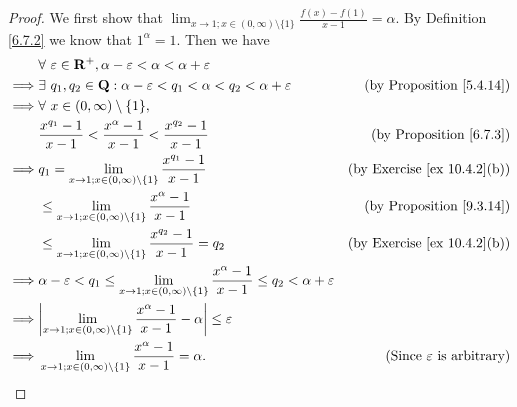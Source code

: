\begin{proof}
    We first show that \(\lim_{x \to 1 ; x \in (0, \infty) \setminus \{1\}} \frac{f(x) - f(1)}{x - 1} = \alpha\).
    By Definition \ref{6.7.2} we know that \(1^{\alpha} = 1\).
    Then we have
    \begin{align*}
                 & \forall\ \varepsilon \in \mathbf{R}^+, \alpha - \varepsilon < \alpha < \alpha + \varepsilon                                                                                                   \\
        \implies & \exists\ q_1, q_2 \in \mathbf{Q} : \alpha - \varepsilon < q_1 < \alpha < q_2 < \alpha + \varepsilon                                             & \text{(by Proposition \ref{5.4.14})}        \\
        \implies & \forall\ x \in (0, \infty) \setminus \{1\},                                                                                                                                                   \\
                 & \frac{x^{q_1} - 1}{x - 1} < \frac{x^{\alpha} - 1}{x - 1} < \frac{x^{q_2} - 1}{x - 1}                                                            & \text{(by Proposition \ref{6.7.3})}         \\
        \implies & q_1 = \lim_{x \to 1 ; x \in (0, \infty) \setminus \{1\}} \frac{x^{q_1} - 1}{x - 1}                                                              & \text{(by Exercise \ref{ex 10.4.2}(b))}     \\
                 & \leq \lim_{x \to 1 ; x \in (0, \infty) \setminus \{1\}} \frac{x^{\alpha} - 1}{x - 1}                                                            & \text{(by Proposition \ref{9.3.14})}        \\
                 & \leq \lim_{x \to 1 ; x \in (0, \infty) \setminus \{1\}} \frac{x^{q_2} - 1}{x - 1} = q_2                                                         & \text{(by Exercise \ref{ex 10.4.2}(b))}     \\
        \implies & \alpha - \varepsilon < q_1 \leq \lim_{x \to 1 ; x \in (0, \infty) \setminus \{1\}} \frac{x^{\alpha} - 1}{x - 1} \leq q_2 < \alpha + \varepsilon                                               \\
        \implies & \abs*{\lim_{x \to 1 ; x \in (0, \infty) \setminus \{1\}} \frac{x^{\alpha} - 1}{x - 1} - \alpha} \leq \varepsilon                                                                              \\
        \implies & \lim_{x \to 1 ; x \in (0, \infty) \setminus \{1\}} \frac{x^{\alpha} - 1}{x - 1} = \alpha.                                                       & \text{(Since \(\varepsilon\) is arbitrary)}
    \end{align*}


\end{proof}
